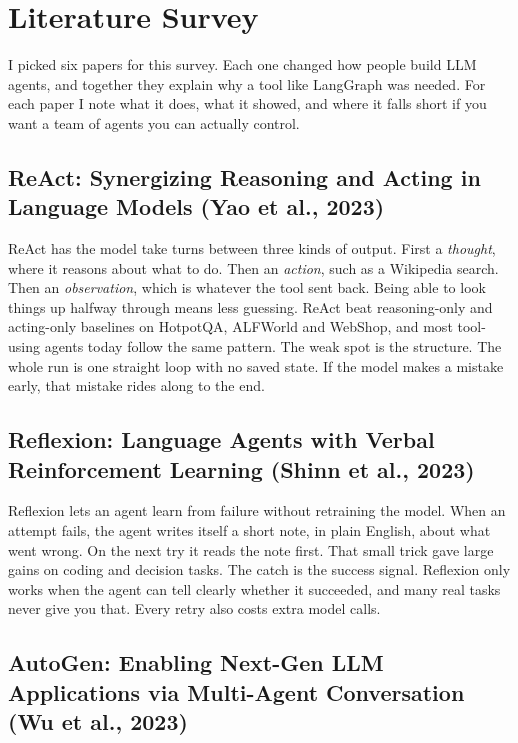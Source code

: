 \documentclass[12pt,a4paper]{report}
\begin{document}
\chapter{Literature Survey}

I picked six papers for this survey. Each one changed how people build LLM agents, and together they explain why a tool like LangGraph was needed. For each paper I note what it does, what it showed, and where it falls short if you want a team of agents you can actually control.

\section{ReAct: Synergizing Reasoning and Acting in Language Models (Yao et al., 2023)}

ReAct \cite{yao2023react} has the model take turns between three kinds of output. First a \emph{thought}, where it reasons about what to do. Then an \emph{action}, such as a Wikipedia search. Then an \emph{observation}, which is whatever the tool sent back. Being able to look things up halfway through means less guessing. ReAct beat reasoning-only and acting-only baselines on HotpotQA, ALFWorld and WebShop, and most tool-using agents today follow the same pattern. The weak spot is the structure. The whole run is one straight loop with no saved state. If the model makes a mistake early, that mistake rides along to the end.

\section{Reflexion: Language Agents with Verbal Reinforcement Learning (Shinn et al., 2023)}

Reflexion \cite{shinn2023reflexion} lets an agent learn from failure without retraining the model. When an attempt fails, the agent writes itself a short note, in plain English, about what went wrong. On the next try it reads the note first. That small trick gave large gains on coding and decision tasks. The catch is the success signal. Reflexion only works when the agent can tell clearly whether it succeeded, and many real tasks never give you that. Every retry also costs extra model calls.

\section{AutoGen: Enabling Next-Gen LLM Applications via Multi-Agent Conversation (Wu et al., 2023)}
\end{document}
